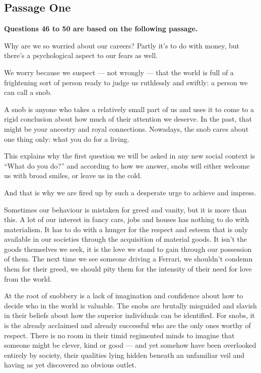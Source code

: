 \documentclass[UTF8,11pt]{ctexart}
\begin{document}
\subsection*{\textbf{Passage One}}


\textbf{Questions 46 to 50 are based on the following passage.}


Why are we so worried about our careers? Partly it’s to do with money, but there’s a psychological aspect to our fears as well.


We worry because we suspect — not wrongly — that the world is full of a frightening sort of person ready to judge us ruthlessly and swiftly: a person we can call a snob.


A snob is anyone who takes a relatively small part of us and uses it to come to a rigid conclusion about how much of their attention we deserve. In the past, that might be your ancestry and royal connections. Nowadays, the snob cares about one thing only: what you do for a living.


This explains why the first question we will be asked in any new social context is “What do you do?” and according to how we answer, snobs will either welcome us with broad smiles, or leave us in the cold.


And that is why we are fired up by such a desperate urge to achieve and impress.


Sometimes our behaviour is mistaken for greed and vanity, but it is more than this. A lot of our interest in fancy cars, jobs and houses has nothing to do with materialism. It has to do with a hunger for the respect and esteem that is only available in our societies through the acquisition of material goods. It isn’t the goods themselves we seek, it is the love we stand to gain through our possession of them. The next time we see someone driving a Ferrari, we shouldn’t condemn them for their greed, we should pity them for the intensity of their need for love from the world.


At the root of snobbery is a lack of imagination and confidence about how to decide who in the world is valuable. The snobs are brutally misguided and slavish in their beliefs about how the superior individuals can be identified. For snobs, it is the already acclaimed and already successful who are the only ones worthy of respect. There is no room in their timid regimented minds to imagine that someone might be clever, kind or good — and yet somehow have been overlooked entirely by society, their qualities lying hidden beneath an unfamiliar veil and having as yet discovered no obvious outlet.
\end{document}
